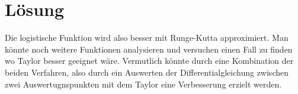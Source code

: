 %
%
%
\section{Lösung
\label{taylor:section:loesung}}
Die logistische Funktion wird also besser mit Runge-Kutta approximiert.
Man könnte noch weitere Funktionen analysieren und versuchen einen Fall zu finden wo Taylor besser geeignet wäre.
Vermutlich könnte durch eine Kombination der beiden Verfahren, also durch ein Auswerten der Differentialgleichung zwischen zwei Auswertugnspunkten mit dem Taylor eine Verbesserung erzielt werden.



